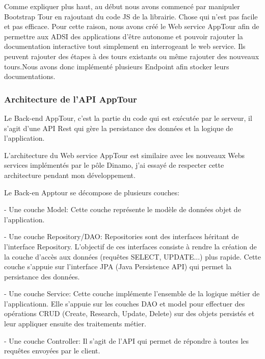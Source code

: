 \documentclass[12pt]{article}
\begin{document}
Comme expliquer plus haut, au début nous avons commencé par manipuler Bootstrap Tour en rajoutant du code JS de la librairie. Chose qui n'est pas facile et pas efficace. Pour cette raison, nous avons créé le Web service AppTour afin de permettre aux ADSI des applications d'être autonome et pouvoir rajouter la documentation interactive tout simplement en interrogeant le web service. Ils peuvent rajouter des étapes à des tours existants ou même rajouter des nouveaux tours.Nous avons donc implémenté plusieurs Endpoint afin stocker leurs documentations.  
 
\subsubsection{Architecture de l'API AppTour}

Le Back-end AppTour, c’est la partie du code qui est exécutée par le serveur, il s'agit d'une API Rest qui gère la persistance des données et la logique de l'application. 

L'architecture du Web service AppTour est similaire avec les nouveaux Webs services implémentés par le pôle Dinamo, j'ai essayé de respecter cette architecture pendant mon développement. 

Le Back-en Apptour se décompose de plusieurs couches: \newline

- Une couche Model: Cette couche représente le modèle de données objet de l'application. \newline

- Une couche Repository/DAO: Repositories sont des interfaces héritant de l'interface Repository. L'objectif de ces interfaces consiste à rendre la création de la couche d'accès aux données (requêtes SELECT, UPDATE...) plus rapide. Cette couche s'appuie sur l'interface JPA (Java Persistence API) qui permet la persistance des données.\newline


- Une couche Service: Cette couche implémente l'ensemble de la logique métier de l'applicationn. Elle s'appuie sur les couches DAO et model pour effectuer des opérations CRUD (Create, Research, Update, Delete) sur des objets persistés et leur appliquer ensuite des traitements métier.\newline


- Une couche Controller: Il s'agit de l'API qui permet de répondre à toutes les requêtes envoyées par le client. 
\end{document}
